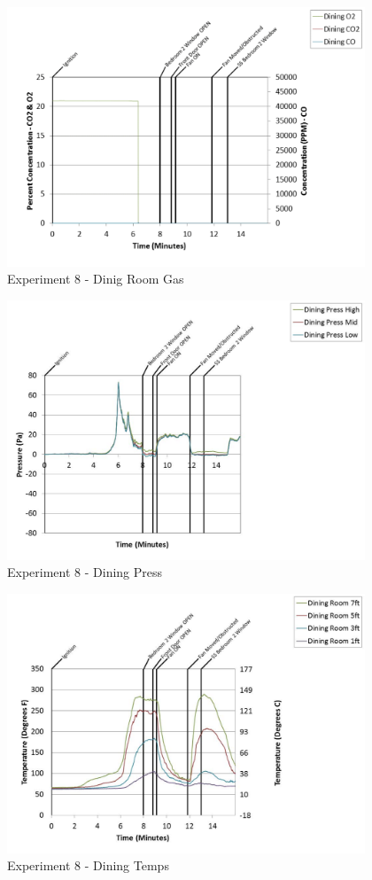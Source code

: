 \documentclass{article}
\begin{document}
\begin{appendices}
	\begin{figure}[h!]
		\centering
		\includegraphics[height=3.05in]{0_Images/Results_Charts/Exp_8_Charts/DinigRoomGas.pdf}
		\caption{Experiment 8 - Dinig Room Gas}
	\end{figure}
 
	\clearpage

	\begin{figure}[h!]
		\centering
		\includegraphics[height=3.05in]{0_Images/Results_Charts/Exp_8_Charts/DiningPress.pdf}
		\caption{Experiment 8 - Dining Press}
	\end{figure}
 

	\begin{figure}[h!]
		\centering
		\includegraphics[height=3.05in]{0_Images/Results_Charts/Exp_8_Charts/DiningTemps.pdf}
		\caption{Experiment 8 - Dining Temps}
	\end{figure}
 

\end{appendices}
\end{document}
